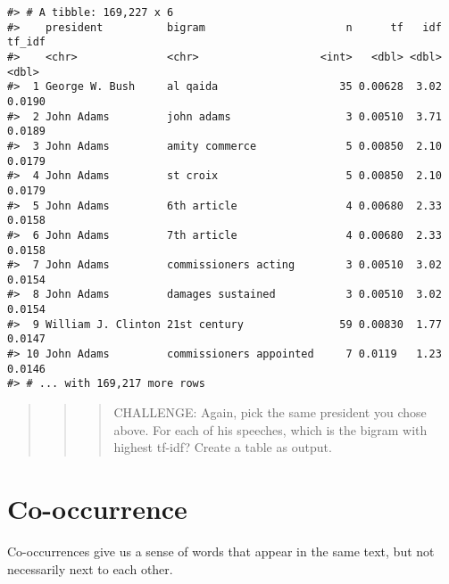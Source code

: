 \documentclass[]{book}
\newenvironment{Shaded}{\begin{snugshade}}{\end{snugshade}}
\newcommand{\KeywordTok}[1]{\textcolor[rgb]{0.13,0.29,0.53}{\textbf{#1}}}
\newcommand{\NormalTok}[1]{#1}
\newcommand{\OperatorTok}[1]{\textcolor[rgb]{0.81,0.36,0.00}{\textbf{#1}}}
\newcommand{\StringTok}[1]{\textcolor[rgb]{0.31,0.60,0.02}{#1}}
\begin{document}
\begin{Shaded}
\end{Shaded}

\begin{verbatim}
#> # A tibble: 169,227 x 6
#>    president          bigram                      n      tf   idf tf_idf
#>    <chr>              <chr>                   <int>   <dbl> <dbl>  <dbl>
#>  1 George W. Bush     al qaida                   35 0.00628  3.02 0.0190
#>  2 John Adams         john adams                  3 0.00510  3.71 0.0189
#>  3 John Adams         amity commerce              5 0.00850  2.10 0.0179
#>  4 John Adams         st croix                    5 0.00850  2.10 0.0179
#>  5 John Adams         6th article                 4 0.00680  2.33 0.0158
#>  6 John Adams         7th article                 4 0.00680  2.33 0.0158
#>  7 John Adams         commissioners acting        3 0.00510  3.02 0.0154
#>  8 John Adams         damages sustained           3 0.00510  3.02 0.0154
#>  9 William J. Clinton 21st century               59 0.00830  1.77 0.0147
#> 10 John Adams         commissioners appointed     7 0.0119   1.23 0.0146
#> # ... with 169,217 more rows
\end{verbatim}

\begin{quote}
\begin{quote}
\begin{quote}
CHALLENGE: Again, pick the same president you chose above. For each of his speeches, which is the bigram with highest tf-idf? Create a table as output.
\end{quote}
\end{quote}
\end{quote}

\hypertarget{co-occurrence}{%
\section{Co-occurrence}\label{co-occurrence}}

Co-occurrences give us a sense of words that appear in the same text, but not necessarily next to each other.
\end{document}
